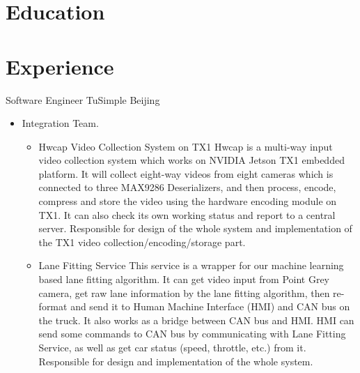\documentclass[10pt,a4paper,roman]{moderncv} %
\begin{document}
\makecvtitle

\vspace{-1cm}

\section{Education}

\section{Experience}
        {Software Engineer}
        {}
        {TuSimple Beijing}
        {}
        {\begin{itemize}%
         \item Integration Team.
               \begin{itemize}%
               \item Hwcap Video Collection System on TX1\newline{}%
                     Hwcap is a multi-way input video collection system which works on NVIDIA Jetson TX1 embedded platform. It will collect eight-way videos from eight cameras which is connected to three MAX9286 Deserializers\footnotemark[1]{}, and then process, encode, compress and store the video using the hardware encoding module on TX1. It can also check its own working status and report to a central server.\newline{}%
                     Responsible for design of the whole system and implementation of the TX1 video collection/encoding/storage part.
               \item Lane Fitting Service\newline{}%
                     This service is a wrapper for our machine learning based lane fitting algorithm. It can get video input from Point Grey camera, get raw lane information by the lane fitting algorithm, then re-format and send it to Human Machine Interface (HMI) and CAN bus on the truck.\newline{}%
                     It also works as a bridge between CAN bus and HMI. HMI can send some commands to CAN bus by communicating with Lane Fitting Service, as well as get car status (speed, throttle, etc.) from it.\newline{}%
                     Responsible for design and implementation of the whole system.
               \end{itemize}
         \end{itemize}}
\end{document}
